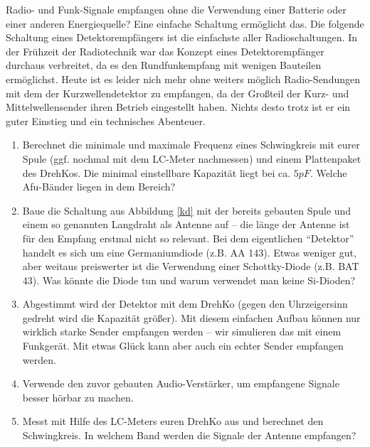 Radio- und Funk-Signale empfangen ohne die Verwendung einer Batterie oder einer
anderen Energiequelle? Eine einfache Schaltung ermöglicht das. Die folgende
Schaltung eines Detektorempfängers ist die einfachste aller Radioschaltungen. In
der Frühzeit der Radiotechnik war das Konzept eines Detektorempfänger durchaus
verbreitet, da es den Rundfunkempfang mit wenigen Bauteilen ermöglichst. Heute
ist es leider nich mehr ohne weiters möglich Radio-Sendungen mit dem der
Kurzwellendetektor zu empfangen, da der Großteil der Kurz- und
Mittelwellensender ihren Betrieb eingestellt haben. Nichts desto trotz ist er
ein guter Einstieg und ein technisches Abenteuer.

\begin{enumerate}
  \item Berechnet die minimale und maximale Frequenz eines Schwingkreis mit
    eurer Spule (ggf. nochmal mit dem LC-Meter nachmessen) und einem
    Plattenpaket des DrehKos. Die minimal einstellbare Kapazität liegt bei ca.
    $5 pF$. Welche Afu-Bänder liegen in dem Bereich?  
  \item Baue die Schaltung aus Abbildung \ref{kd} mit der bereits gebauten
    Spule und einem so genannten Langdraht als Antenne auf -- die länge der
    Antenne ist für den Empfang erstmal nicht so relevant. Bei dem
    eigentlichen "`Detektor"' handelt es sich um eine Germaniumdiode (z.B. AA
    143). Etwas weniger gut, aber weitaus preiswerter ist die Verwendung einer
    Schottky-Diode (z.B. BAT 43).  Was könnte die Diode tun und warum
    verwendet man keine Si-Dioden?
  \item Abgestimmt wird der Detektor mit dem DrehKo (gegen den Uhrzeigersinn
    gedreht wird die Kapazität größer). Mit diesem einfachen Aufbau können nur
    wirklich starke Sender empfangen werden -- wir simulieren das mit einem
    Funkgerät.  Mit etwas Glück kann aber auch ein echter Sender empfangen
    werden.
  \item Verwende den zuvor gebauten Audio-Verstärker, um empfangene Signale
    besser hörbar zu machen.
  \item Messt mit Hilfe des LC-Meters euren DrehKo aus und berechnet den
    Schwingkreis. In welchem Band werden die Signale der Antenne empfangen?
\end{enumerate}

